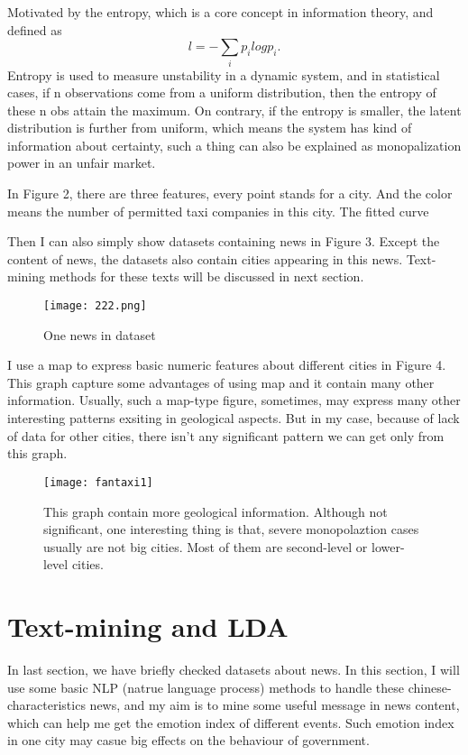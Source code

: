 \documentclass[12pt]{extarticle}
\begin{document}
Motivated by the entropy, which is a core concept in information theory, and defined as
$$l = -\sum_{i}p_i log p_i.$$
 Entropy is used to measure unstability in a dynamic system, and in statistical cases, if n observations come from a uniform distribution, then the entropy of these n obs attain the maximum. On contrary, if the entropy is smaller, the latent distribution is further from uniform, which means the system has kind of information about certainty, such a thing can also be explained as monopalization power in an unfair market.

In Figure 2, there are three features, every point stands for a city. And the color means the number of permitted taxi companies in this city. The fitted curve  

Then I can also simply show datasets containing news in Figure 3. Except the content of news, the datasets also contain cities appearing in this news. Text-mining methods for these texts will be discussed in next section.
\begin{figure}
	\centering
	\texttt{[image: 222.png]}
	\caption{One news in dataset}
	\label{fig:screen-shot-2019-05-07-at-23}
\end{figure}

I use a map to express basic numeric features about different cities in Figure 4. This graph capture some advantages of using map and it contain many other information. Usually, such a map-type figure, sometimes, may express many other interesting patterns exsiting in geological aspects. But in my case, because of lack of data for other cities, there isn't any significant pattern we can get only from this graph.
\begin{figure}
	\centering
	\texttt{[image: fantaxi1]}
	\caption{This graph contain more geological information. Although not significant, one interesting thing is that, severe monopolaztion cases usually are not big cities. Most of them are second-level or lower-level cities. }
	\label{fig:fantaxi1}
\end{figure}


\section{Text-mining and LDA}
In last section, we have briefly checked datasets about news. In this section, I will use some basic NLP (natrue language process) methods to handle these chinese-characteristics news, and my aim is to mine some useful message in news content, which can help me get the emotion index of different events. Such emotion index in one city may casue big effects on the behaviour of government.
\end{document}

